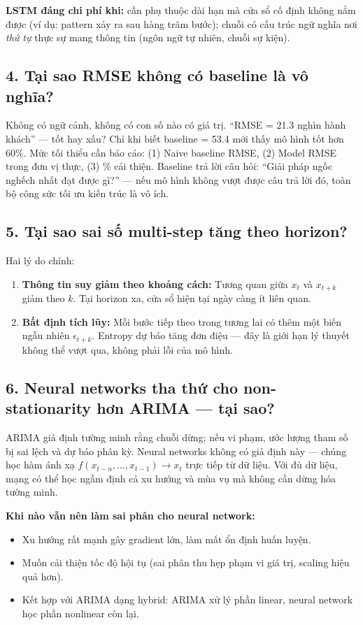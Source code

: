\documentclass[12pt,a4paper]{article}
\begin{document}
\textbf{LSTM đáng chi phí khi:} cần phụ thuộc dài hạn mà cửa sổ cố định không nắm được (ví dụ: pattern xảy ra sau hàng trăm bước); chuỗi có cấu trúc ngữ nghĩa nơi \textit{thứ tự} thực sự mang thông tin (ngôn ngữ tự nhiên, chuỗi sự kiện).

\subsection*{4. Tại sao RMSE không có baseline là vô nghĩa?}

Không có ngữ cảnh, không có con số nào có giá trị. ``RMSE = 21.3 nghìn hành khách'' --- tốt hay xấu? Chỉ khi biết baseline = 53.4 mới thấy mô hình tốt hơn $60\%$. Mức tối thiểu cần báo cáo: (1) Naive baseline RMSE, (2) Model RMSE trong đơn vị thực, (3) \% cải thiện. Baseline trả lời câu hỏi: ``Giải pháp ngốc nghếch nhất đạt được gì?'' --- nếu mô hình không vượt được câu trả lời đó, toàn bộ công sức tối ưu kiến trúc là vô ích.

\subsection*{5. Tại sao sai số multi-step tăng theo horizon?}

Hai lý do chính:
\begin{enumerate}
    \item \textbf{Thông tin suy giảm theo khoảng cách:} Tương quan giữa $x_t$ và $x_{t+k}$ giảm theo $k$. Tại horizon xa, cửa sổ hiện tại ngày càng ít liên quan.
    \item \textbf{Bất định tích lũy:} Mỗi bước tiếp theo trong tương lai có thêm một biến ngẫu nhiên $\epsilon_{t+k}$. Entropy dự báo tăng đơn điệu --- đây là giới hạn lý thuyết không thể vượt qua, không phải lỗi của mô hình.
\end{enumerate}

\subsection*{6. Neural networks tha thứ cho non-stationarity hơn ARIMA --- tại sao?}

ARIMA giả định tường minh rằng chuỗi dừng; nếu vi phạm, ước lượng tham số bị sai lệch và dự báo phân kỳ. Neural networks không có giả định này --- chúng học hàm ánh xạ $f(x_{t-n},\ldots,x_{t-1}) \to x_t$ trực tiếp từ dữ liệu. Với đủ dữ liệu, mạng có thể học ngầm định cả xu hướng và mùa vụ mà không cần dừng hóa tường minh.

\textbf{Khi nào vẫn nên làm sai phân cho neural network:}
\begin{itemize}
    \item Xu hướng rất mạnh gây gradient lớn, làm mất ổn định huấn luyện.
    \item Muốn cải thiện tốc độ hội tụ (sai phân thu hẹp phạm vi giá trị, scaling hiệu quả hơn).
    \item Kết hợp với ARIMA dạng hybrid: ARIMA xử lý phần linear, neural network học phần nonlinear còn lại.
\end{itemize}
\end{document}
